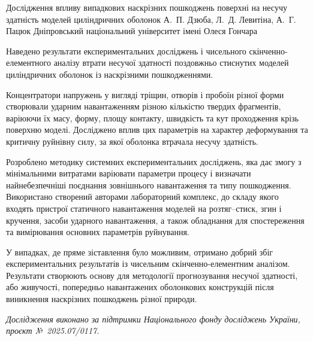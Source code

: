 \ReportHeading
  {Дослідження впливу випадкових наскрізних пошкоджень поверхні на несучу здатність моделей циліндричних оболонок}
  {А.~П. Дзюба, Л.~Д. Левитіна, А.~Г. Пацюк}
  {Дніпровський національний університет імені Олеся Гончара}
  {}

Наведено результати експериментальних досліджень і чисельного скінченно-елементного аналізу втрати несучої здатності поздовжньо стиснутих моделей циліндричних оболонок із наскрізними пошкодженнями.

Концентратори напружень у вигляді тріщин, отворів і пробоїн різної форми створювали ударним навантаженням різною кількістю твердих фрагментів, варіюючи їх масу, форму, площу контакту, швидкість та кут проходження крізь поверхню моделі. Досліджено вплив цих параметрів на характер деформування та критичну руйнівну силу, за якої оболонка втрачала несучу здатність.

Розроблено методику системних експериментальних досліджень, яка дає змогу з мінімальними витратами варіювати параметри процесу і визначати найнебезпечніші поєднання зовнішнього навантаження та типу пошкодження. Використано створений авторами лабораторний комплекс, до складу якого входять пристрої статичного навантаження моделей на розтяг--стиск, згин і кручення, засоби ударного навантаження, а також обладнання для спостереження та вимірювання основних параметрів руйнування.

У випадках, де пряме зіставлення було можливим, отримано добрий збіг експериментальних результатів із чисельним скінченно-елементним аналізом. Результати створюють основу для методології прогнозування несучої здатності, або живучості, попередньо навантажених оболонкових конструкцій після виникнення наскрізних пошкоджень різної природи.

\textit{Дослідження виконано за підтримки Національного фонду досліджень України, проєкт №~2025.07/0117.}
